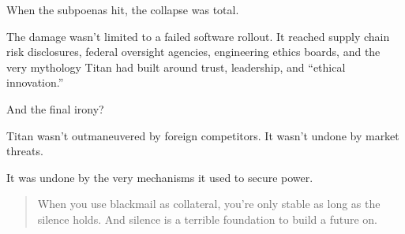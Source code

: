 \medskip

When the subpoenas hit, the collapse was total.

The damage wasn’t limited to a failed software rollout.
It reached supply chain risk disclosures, federal oversight agencies, engineering ethics boards, and the very mythology Titan had built around trust, leadership, and “ethical innovation.”

And the final irony?

Titan wasn’t outmaneuvered by foreign competitors.
It wasn’t undone by market threats.

It was undone by the very mechanisms it used to secure power. 

\begin{quote}
    When you use blackmail as collateral,
    you’re only stable as long as the silence holds.
    And silence is a terrible foundation to build a future on.
\end{quote}

